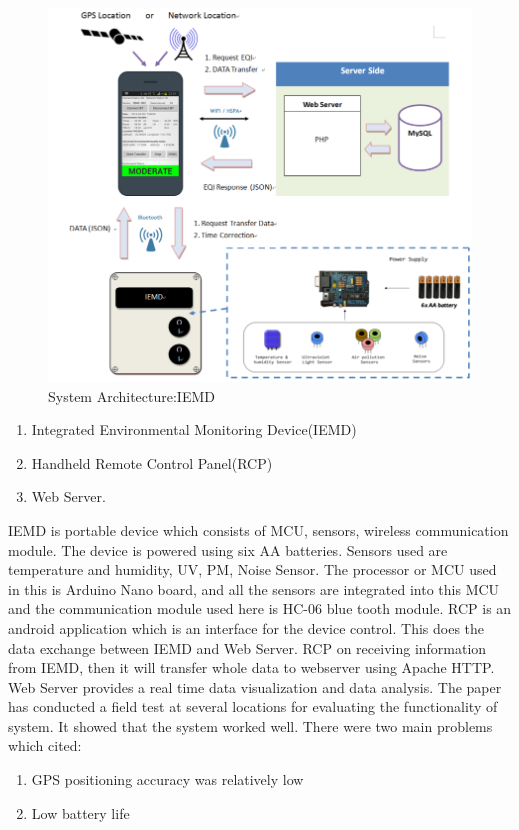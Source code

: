 \documentclass[10pt,a4paper]{report}
\begin{document}
\begin{figure}[h!]
  \centering
  \hspace*{-1.25cm}   
\includegraphics[scale=0.34]{images/fig1.png}
  \hspace*{-1.25cm}
  \caption{System Architecture:IEMD}
  \label{arch}
\end{figure}


\begin{enumerate}
\item	Integrated Environmental Monitoring Device(IEMD)
\item	Handheld Remote Control Panel(RCP)
\item	Web Server.
\end{enumerate}

 
IEMD is portable device which consists of MCU, sensors, wireless communication module. The device is powered using six AA batteries. Sensors used are temperature and humidity, UV, PM, Noise Sensor.
The processor or MCU used in this is Arduino Nano board, and all the sensors are integrated into this MCU and the communication module used here is HC-06 blue tooth module.
RCP is an android application which is an interface for the device control. This does the data exchange between IEMD and Web Server. RCP on receiving information from IEMD, then it will transfer whole data to webserver using Apache HTTP.
Web Server provides a real time data visualization and data analysis. The paper has conducted a field test at several locations for evaluating the functionality of system. It showed that the system worked well. There were two main problems which cited:
\begin{enumerate}
\item GPS positioning accuracy was relatively low
\item Low battery life

\end{enumerate}
\end{document}
